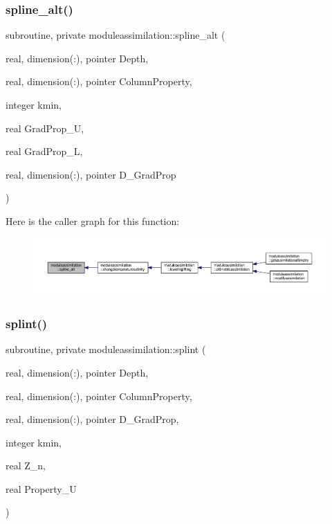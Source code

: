 \subsubsection{\texorpdfstring{spline\+\_\+alt()}{spline\_alt()}}
{\footnotesize\ttfamily subroutine, private moduleassimilation\+::spline\+\_\+alt (\begin{DoxyParamCaption}\item[{real, dimension(\+:), pointer}]{Depth,  }\item[{real, dimension(\+:), pointer}]{Column\+Property,  }\item[{integer}]{kmin,  }\item[{real}]{Grad\+Prop\+\_\+U,  }\item[{real}]{Grad\+Prop\+\_\+L,  }\item[{real, dimension(\+:), pointer}]{D\+\_\+\+Grad\+Prop }\end{DoxyParamCaption})\hspace{0.3cm}{\ttfamily [private]}}

Here is the caller graph for this function\+:\nopagebreak
\begin{figure}[H]
\begin{center}
\leavevmode
\includegraphics[width=350pt]{namespacemoduleassimilation_a4473000cecbde1abb63d63fc9a6f5858_icgraph}
\end{center}
\end{figure}
\mbox{\label{namespacemoduleassimilation_a5db3c59220db22267e7e1e7eca84a356}} 
\subsubsection{\texorpdfstring{splint()}{splint()}}
{\footnotesize\ttfamily subroutine, private moduleassimilation\+::splint (\begin{DoxyParamCaption}\item[{real, dimension(\+:), pointer}]{Depth,  }\item[{real, dimension(\+:), pointer}]{Column\+Property,  }\item[{real, dimension(\+:), pointer}]{D\+\_\+\+Grad\+Prop,  }\item[{integer}]{kmin,  }\item[{real}]{Z\+\_\+n,  }\item[{real}]{Property\+\_\+U }\end{DoxyParamCaption})\hspace{0.3cm}{\ttfamily [private]}}

